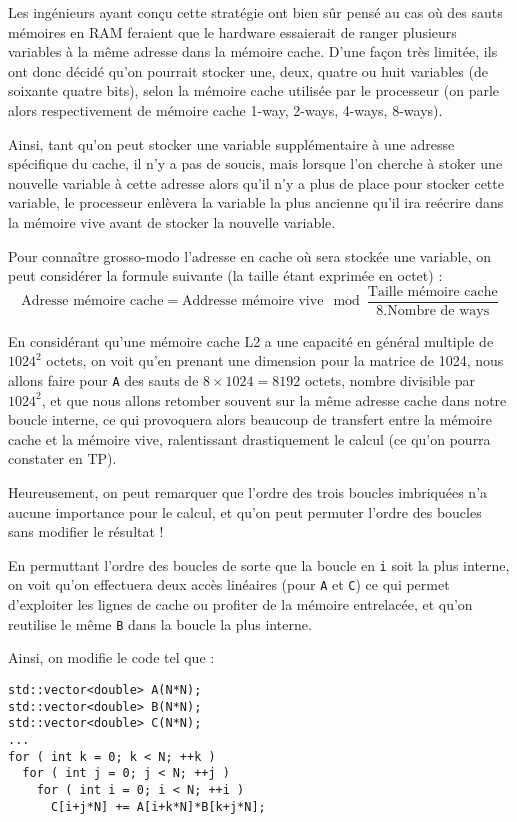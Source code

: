 \documentclass[fleqn,11pt]{article}
\begin{document}
Les ingénieurs ayant conçu cette stratégie ont bien sûr pensé au cas où des sauts mémoires en RAM feraient que le hardware essaierait de ranger plusieurs variables à la même adresse dans la mémoire cache. D'une façon très limitée, ils ont donc décidé qu'on pourrait stocker une, deux, quatre ou huit variables (de soixante quatre bits), selon la mémoire cache utilisée par le processeur (on parle alors respectivement de mémoire cache 1-way, 2-ways, 4-ways, 8-ways).

Ainsi, tant qu'on peut stocker une variable supplémentaire à une adresse spécifique du cache, il n'y a pas de soucis, mais lorsque l'on cherche à stoker une nouvelle variable à cette adresse alors qu'il n'y a plus de place pour stocker cette variable, le processeur enlèvera la variable la plus ancienne qu'il ira reécrire dans la mémoire vive avant de stocker la nouvelle variable. 

Pour connaître grosso-modo l'adresse en cache où sera stockée une variable, on peut considérer la formule suivante (la taille étant exprimée en octet) :
\[
\textrm{Adresse mémoire cache} = \textrm{Addresse mémoire vive} \mod \frac{\textrm{Taille mémoire cache}}{8.\textrm{Nombre de ways}}
\]

En considérant qu'une mémoire cache L2 a une capacité en général multiple de $1024^{2}$ octets, on voit
qu'en prenant une dimension pour la matrice de 1024, nous allons faire pour \texttt{A} des sauts de
$8\times 1024 = 8192$ octets, nombre divisible par $1024^{2}$, et que nous allons retomber souvent sur la
même adresse cache dans notre boucle interne, ce qui provoquera alors beaucoup de transfert entre la mémoire cache et la mémoire vive, ralentissant drastiquement le calcul (ce qu'on pourra constater en TP).

Heureusement, on peut remarquer que l'ordre des trois boucles imbriquées n'a aucune importance pour le
calcul, et qu'on peut permuter l'ordre des boucles sans modifier le résultat !

En permuttant l'ordre des boucles de sorte que la boucle en \texttt{i} soit la plus interne, on voit qu'on effectuera deux accès linéaires (pour \texttt{A} et \texttt{C}) ce qui permet d'exploiter les lignes de cache ou profiter de la mémoire entrelacée, et qu'on reutilise le même \texttt{B} dans la boucle la plus interne.

Ainsi, on modifie le code tel que :

\begin{lstlisting}
std::vector<double> A(N*N);
std::vector<double> B(N*N);
std::vector<double> C(N*N);
...
for ( int k = 0; k < N; ++k )
  for ( int j = 0; j < N; ++j )
    for ( int i = 0; i < N; ++i )
      C[i+j*N] += A[i+k*N]*B[k+j*N];
\end{lstlisting}
\end{document}
